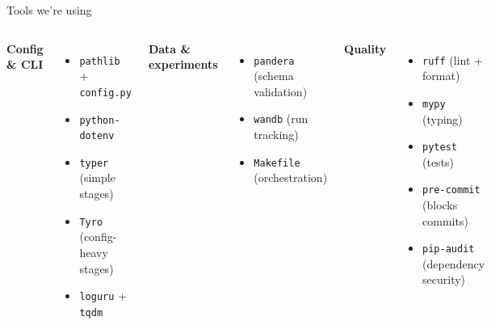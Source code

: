 \documentclass[11pt]{beamer}
\begin{document}
\begin{frame}{Tools we're using}
  \begin{columns}[T]
    \textbf{Config \& CLI}
    \begin{itemize}
      \item \texttt{pathlib} + \texttt{config.py}
      \item \texttt{python-dotenv}
      \item \texttt{typer} (simple stages)
      \item \texttt{Tyro} (config-heavy stages)
      \item \texttt{loguru} + \texttt{tqdm}
    \end{itemize}
    \vspace{0.5em}
    \textbf{Data \& experiments}
    \begin{itemize}
      \item \texttt{pandera} (schema validation)
      \item \texttt{wandb} (run tracking)
      \item \texttt{Makefile} (orchestration)
    \end{itemize}
    \textbf{Quality}
    \begin{itemize}
      \item \texttt{ruff} (lint + format)
      \item \texttt{mypy} (typing)
      \item \texttt{pytest} (tests)
      \item \texttt{pre-commit} (blocks commits)
      \item \texttt{pip-audit} (dependency security)
    \end{itemize}
  \end{columns}
\end{frame}
\end{document}

